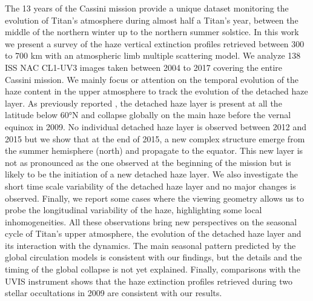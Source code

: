 The 13 years of the Cassini mission provide a unique dataset monitoring
the evolution of Titan’s atmosphere during almost half a Titan's year,
between the middle of the northern winter up to the northern summer solstice.
In this work we present a survey of the haze vertical extinction profiles retrieved
between 300 to 700 km with an atmospheric limb multiple scattering model.
We analyze 138 ISS NAC CL1-UV3 images taken between 2004 to 2017 covering the
entire Cassini mission.
We mainly focus or attention on the temporal evolution of the haze content
in the upper atmosphere to track the evolution of the detached haze layer.
As previously reported \citep{West2011}, the detached haze layer is present
at all the latitude below \ang{60}N and collapse globally on the main haze
before the vernal equinox in 2009.
No individual detached haze layer is observed between 2012 and 2015 but
we show that at the end of 2015, a new complex structure emerge from
the summer hemisphere (north) and propagate to the equator. This new layer
is not as pronounced as the one observed at the beginning of the mission but
is likely to be the initiation of a new detached haze layer.
We also investigate the short time scale variability of the detached haze
layer and no major changes is observed. Finally, we report some cases
where the viewing geometry allows us to probe the longitudinal variability
of the haze, highlighting some local inhomogeneities.
All these observations bring new perspectives
on the seasonal cycle of Titan's upper atmosphere, the evolution of the detached
haze layer and its interaction with the dynamics.
The main seasonal pattern predicted by the global circulation models is consistent
with our findings, but the details and the timing of the global collapse
is not yet explained. Finally, comparisons with the UVIS instrument shows
that the haze extinction profiles retrieved during two stellar occultations
in 2009 are consistent with our results.
